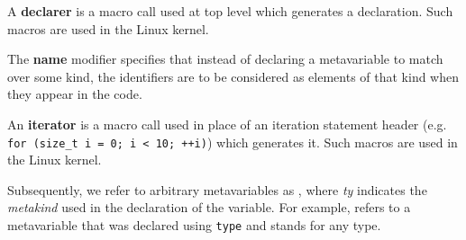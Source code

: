 A {\bf declarer} is a macro call used at top level which generates a
declaration. Such macros are used in the Linux kernel.

The {\bf name} modifier specifies that instead of declaring a metavariable to
match over some kind, the identifiers are to be considered as elements of that
kind when they appear in the code.

An {\bf iterator} is a macro call used in place of an iteration statement header
(e.g. {\tt for (size\_t i = 0; i < 10; ++i)}) which generates it. Such macros
are used in the Linux kernel.

Subsequently, we refer to arbitrary metavariables as
, where {\it{ty}}
indicates the {\it metakind} used in the declaration of the variable.
For example,  refers to a metavariable
that was declared using \texttt{type} and stands for any type.


